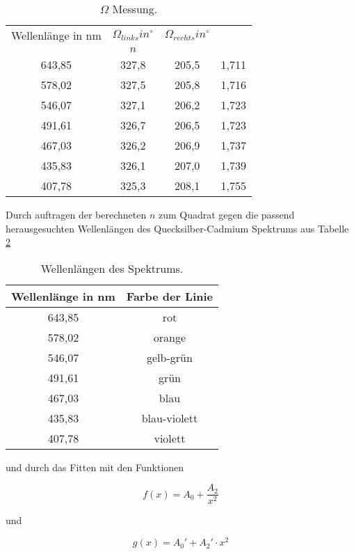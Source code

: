 \begin{table} 
  \centering
  \caption{$\Omega$ Messung.}
  \label{tab:omega}
\begin{tabular}{c c c c}
  \toprule
  Wellenlänge in nm & $\Omega_{links} in ^\circ$ & $\Omega_{rechts} in ^\circ$\\ & $n$\\ 
  \midrule
  643,85  &  327,8  &  205,5  &  1,711  \\
  578,02  &  327,5  &  205,8  &  1,716  \\
  546,07  &  327,1  &  206,2  &  1,723  \\
  491,61  &  326,7  &  206,5  &  1,723 \\
  467,03  &  326,2  &  206,9  &  1,737 \\
  435,83  &  326,1  &  207,0  &  1,739  \\
  407,78  &  325,3  &  208,1  &  1,755  \\
  \bottomrule
\end{tabular}
\end{table}
\FloatBarrier

Durch auftragen der berechneten $n$ zum Quadrat gegen die passend herausgesuchten Wellenlängen des Quecksilber-Cadmium Spektrums \cite{sample} aus Tabelle \ref{tab:wellen}

\begin{table}
  \centering
  \caption{Wellenlängen des Spektrums.}
  \label{tab:wellen}
  \begin{tabular}{c c}
    \toprule
    Wellenlänge in nm & Farbe der Linie \\
    \midrule
    643,85 & rot \\
    578,02 & orange \\
    546,07 & gelb-grün \\
    491,61 & grün \\
    467,03 & blau \\
    435,83 & blau-violett \\
    407,78 & violett \\
    \bottomrule 
  \end{tabular}
\end{table}
\FloatBarrier

und durch das Fitten mit den Funktionen

\begin{equation}
  f(x) = A_0 + \frac{A_2}{x^2}
  \label{eqn:glf}
\end{equation}

und 

\begin{equation}
  g(x) = A_0' + A_2' \cdot x^2
  \label{eqn:glg}
\end{equation}

